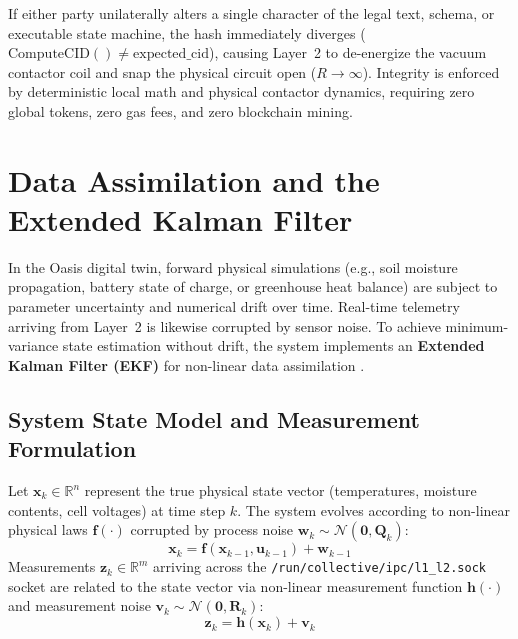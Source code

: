 If either party unilaterally alters a single character of the legal text, schema, or executable state machine, the hash immediately diverges ($\mathrm{ComputeCID}() \ne \mathrm{expected\_cid}$), causing Layer~2 to de-energize the vacuum contactor coil and snap the physical circuit open ($R \to \infty$). Integrity is enforced by deterministic local math and physical contactor dynamics, requiring zero global tokens, zero gas fees, and zero blockchain mining.

\section{Data Assimilation and the Extended Kalman Filter}
\label{sec:kalman_filtering}

In the Oasis digital twin, forward physical simulations (e.g., soil moisture propagation, battery state of charge, or greenhouse heat balance) are subject to parameter uncertainty and numerical drift over time. Real-time telemetry arriving from Layer~2 is likewise corrupted by sensor noise. To achieve minimum-variance state estimation without drift, the system implements an \textbf{Extended Kalman Filter (EKF)} for non-linear data assimilation \cite{astrom2008feedback}.

\subsection{System State Model and Measurement Formulation}
Let $\mathbf{x}_k \in \mathbb{R}^n$ represent the true physical state vector (temperatures, moisture contents, cell voltages) at time step $k$. The system evolves according to non-linear physical laws $\mathbf{f}(\cdot)$ corrupted by process noise $\mathbf{w}_k \sim \mathcal{N}(\mathbf{0}, \mathbf{Q}_k)$:
\begin{equation}
\mathbf{x}_k = \mathbf{f}(\mathbf{x}_{k-1}, \mathbf{u}_{k-1}) + \mathbf{w}_{k-1}
\label{eq:ekf_state}
\end{equation}
Measurements $\mathbf{z}_k \in \mathbb{R}^m$ arriving across the \texttt{/run/collective/ipc/l1\_l2.sock} socket are related to the state vector via non-linear measurement function $\mathbf{h}(\cdot)$ and measurement noise $\mathbf{v}_k \sim \mathcal{N}(\mathbf{0}, \mathbf{R}_k)$:
\begin{equation}
\mathbf{z}_k = \mathbf{h}(\mathbf{x}_k) + \mathbf{v}_k
\label{eq:ekf_measurement}
\end{equation}


